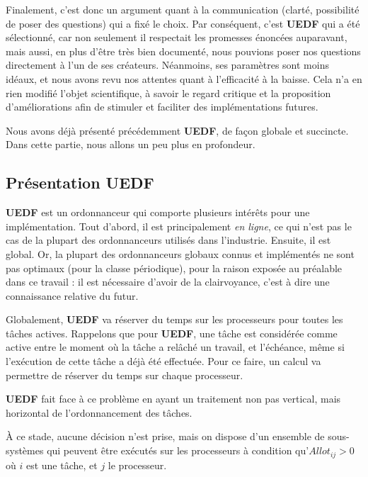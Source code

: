 	
	Finalement, c'est donc un argument quant à la communication (clarté, possibilité de poser des questions) 
	qui a fixé le choix. Par conséquent, c'est \textbf{UEDF} qui a été sélectionné, car 
	non seulement il respectait 
	les promesses énoncées auparavant, mais aussi, en plus d'être très bien documenté, 
	 nous pouvions poser nos questions directement à l'un de ses créateurs. Néanmoins, ses paramètres sont moins idéaux, 
	et nous avons revu nos attentes quant à l'efficacité à la baisse. Cela n'a en rien 
	modifié l'objet scientifique, à savoir le regard critique et la proposition d'améliorations 
	afin de stimuler et faciliter des implémentations futures.\newline
	
	
	Nous avons déjà présenté précédemment \textbf{UEDF}, de façon globale et succincte. 
	Dans cette partie, nous allons un peu plus en profondeur.
	
	
	\subsection{Présentation UEDF}
	\textbf{UEDF} est un ordonnanceur qui comporte plusieurs intérêts pour une implémentation.
	Tout d'abord, il est principalement \textit{en ligne}, ce qui n'est pas le cas de 
	la plupart des ordonnanceurs utilisés dans l'industrie.
	Ensuite, il est global. Or, la plupart des ordonnanceurs 
	globaux connus et implémentés ne sont pas optimaux (pour la classe périodique), pour la
	raison exposée au préalable dans ce travail : il est nécessaire d'avoir de la clairvoyance, 
	c'est à dire une connaissance relative du futur.\newline
	
	Globalement, \textbf{UEDF} va réserver du temps sur les processeurs pour toutes les tâches actives.
	Rappelons que pour \textbf{UEDF}, une tâche est considérée comme active entre le moment où la tâche 
	a relâché un travail, et l'échéance, même si l'exécution de cette tâche a déjà été effectuée.
	Pour ce faire, un calcul va permettre de réserver du temps sur chaque processeur.
	
	\textbf{UEDF} fait face à ce problème en ayant un traitement non pas vertical, mais horizontal
	de l'ordonnancement des tâches.	

	À ce stade, aucune décision n'est prise, mais on dispose d'un ensemble de sous-systèmes qui peuvent 
	être exécutés sur les processeurs à condition qu'$Allot_{ij} > 0$ où $i$ est une tâche, 
	et $j$ le processeur.
	

